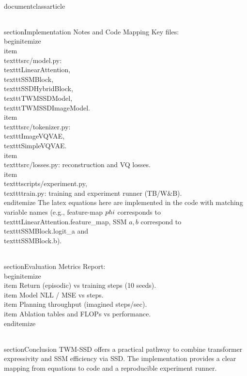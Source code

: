 \\documentclass{article}
\begin{document}
\\section{Implementation Notes and Code Mapping}
Key files:
\\begin{itemize}
  \\item \\texttt{src/model.py}: \\texttt{LinearAttention}, \\texttt{SSMBlock}, \\texttt{SSDHybridBlock}, \\texttt{TWMSSDModel}, \\texttt{TWMSSDImageModel}.
  \\item \\texttt{src/tokenizer.py}: \\texttt{ImageVQVAE}, \\texttt{SimpleVQVAE}.
  \\item \\texttt{src/losses.py}: reconstruction and VQ losses.
  \\item \\texttt{scripts/experiment.py}, \\texttt{train.py}: training and experiment runner (TB/W&B).
\\end{itemize}
The latex equations here are implemented in the code with matching variable names (e.g., feature-map $\\phi$ corresponds to \\texttt{LinearAttention.feature_map}, SSM $a,b$ correspond to \\texttt{SSMBlock.logit_a} and \\texttt{SSMBlock.b}).

\\section{Evaluation Metrics}
Report:
\\begin{itemize}
  \\item Return (episodic) vs training steps (10 seeds).
  \\item Model NLL / MSE vs steps.
  \\item Planning throughput (imagined steps/sec).
  \\item Ablation tables and FLOPs vs performance.
\\end{itemize}

\\section{Conclusion}
TWM-SSD offers a practical pathway to combine transformer expressivity and SSM efficiency via SSD. The implementation provides a clear mapping from equations to code and a reproducible experiment runner.
\end{document}

